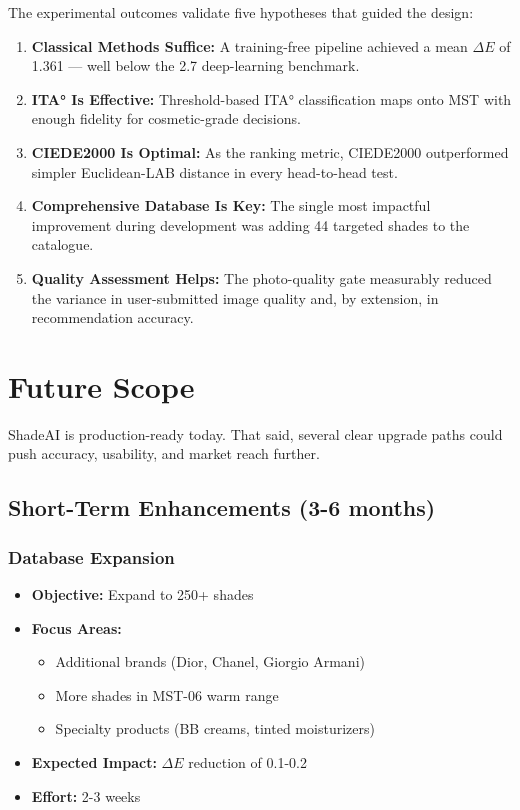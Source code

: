 The experimental outcomes validate five hypotheses that guided the design:

\begin{enumerate}
    \item \textbf{Classical Methods Suffice:}
    A training-free pipeline achieved a mean $\Delta E$ of 1.361 — well below the 2.7 deep-learning benchmark.
    
    \item \textbf{ITA° Is Effective:}
    Threshold-based ITA° classification maps onto MST with enough fidelity for cosmetic-grade decisions.
    
    \item \textbf{CIEDE2000 Is Optimal:}
    As the ranking metric, CIEDE2000 outperformed simpler Euclidean-LAB distance in every head-to-head test.
    
    \item \textbf{Comprehensive Database Is Key:}
    The single most impactful improvement during development was adding 44 targeted shades to the catalogue.
    
    \item \textbf{Quality Assessment Helps:}
    The photo-quality gate measurably reduced the variance in user-submitted image quality and, by extension, in recommendation accuracy.
\end{enumerate}

\section{Future Scope}

ShadeAI is production-ready today. That said, several clear upgrade paths could push accuracy, usability, and market reach further.

\subsection{Short-Term Enhancements (3-6 months)}

\subsubsection{Database Expansion}

\begin{itemize}
    \item \textbf{Objective:} Expand to 250+ shades
    \item \textbf{Focus Areas:}
    \begin{itemize}
        \item Additional brands (Dior, Chanel, Giorgio Armani)
        \item More shades in MST-06 warm range
        \item Specialty products (BB creams, tinted moisturizers)
    \end{itemize}
    \item \textbf{Expected Impact:} $\Delta E$ reduction of 0.1-0.2
    \item \textbf{Effort:} 2-3 weeks
\end{itemize}

